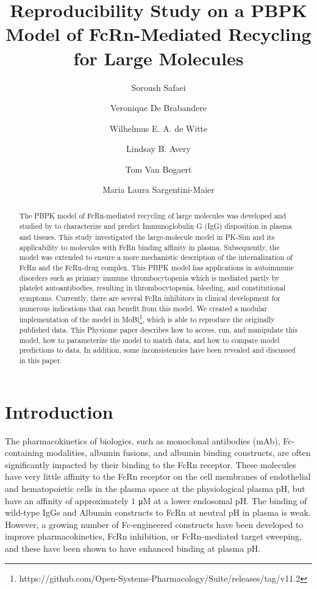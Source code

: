\documentclass[fleqn,10pt]{physiome}
\title{Reproducibility Study on a PBPK Model of FcRn-Mediated Recycling for Large Molecules}
\author[1][soroush.safaei@sanofi.com]{Soroush Safaei}
\author[1]{Veronique De Brabandere}
\author[3]{Wilhelmus E. A. de Witte}
\author[2]{Lindsay B. Avery}
\author[1]{Tom Van Bogaert}
\author[1]{Maria Laura Sargentini-Maier}
\affil[1]{Sanofi R\&D, Ghent, Belgium}
\affil[2]{Sanofi R\&D, Cambridge, USA}
\affil[3]{esqLABS GmbH, Saterland, Germany}
\begin{document}
\maketitle

\begin{abstract}
The PBPK model of FcRn-mediated recycling of large molecules was developed and studied by \cite{de2023mechanistic} to characterize and predict Immunoglobulin G (IgG) disposition in plasma and tissues. This study investigated the large-molecule model in PK-Sim\textsuperscript{\textregistered} and its applicability to molecules with FcRn binding affinity in plasma. Subsequently, the model was extended to ensure a more mechanistic description of the internalization of FcRn and the FcRn-drug complex. This PBPK model has applications in autoimmune disorders such as primary immune thrombocytopenia which is mediated partly by platelet autoantibodies, resulting in thrombocytopenia, bleeding, and constitutional symptoms. Currently, there are several FcRn inhibitors in clinical development for numerous indications that can benefit from this model. We created a modular implementation of the model in MoBi\textsuperscript{\textregistered}\footnote{https://github.com/Open-Systems-Pharmacology/Suite/releases/tag/v11.2}, which is able to reproduce the originally published data. This Physiome paper describes how to access, run, and manipulate this model, how to parameterize the model to match data, and how to compare model predictions to data. In addition, some inconsistencies have been revealed and discussed in this paper.
\end{abstract}




\section{Introduction}

The pharmacokinetics of biologics, such as monoclonal antibodies (mAb), Fc-containing modalities, albumin fusions, and albumin binding constructs, are often significantly impacted by their binding to the FcRn receptor. These molecules have very little affinity to the FcRn receptor on the cell membranes of endothelial and hematopoietic cells in the plasma space at the physiological plasma pH, but have an affinity of approximately $1$ \si{\micro M} at a lower endosomal pH. The binding of wild-type IgGs and Albumin constructs to FcRn at neutral pH in plasma is weak. However, a growing number of Fc-engineered constructs have been developed to improve pharmacokinetics, FcRn inhibition, or FcRn-mediated target sweeping, and these have been shown to have enhanced binding at plasma pH. 
\end{document}

